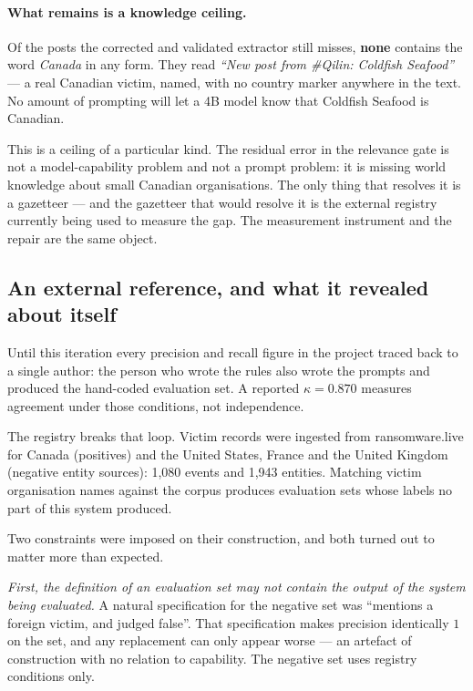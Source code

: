 \documentclass[11pt]{article}
\begin{document}
\paragraph{What remains is a knowledge ceiling.}
Of the posts the corrected and validated extractor still misses, \textbf{none}
contains the word \emph{Canada} in any form. They read \emph{``New post from
\#Qilin: Coldfish Seafood''} --- a real Canadian victim, named, with no country
marker anywhere in the text. No amount of prompting will let a 4B model know
that Coldfish Seafood is Canadian.

\begin{keybox}
This is a ceiling of a particular kind. The residual error in the relevance
gate is not a model-capability problem and not a prompt problem: it is missing
world knowledge about small Canadian organisations. The only thing that
resolves it is a gazetteer --- and the gazetteer that would resolve it is the
external registry currently being used to measure the gap. The measurement
instrument and the repair are the same object.
\end{keybox}

\subsection{An external reference, and what it revealed about itself}

Until this iteration every precision and recall figure in the project traced
back to a single author: the person who wrote the rules also wrote the
prompts and produced the hand-coded evaluation set. A reported $\kappa = 0.870$
measures agreement under those conditions, not independence.

The registry breaks that loop. Victim records were ingested from
ransomware.live for Canada (positives) and the United States, France and the
United Kingdom (negative entity sources): 1{,}080 events and 1{,}943 entities.
Matching victim organisation names against the corpus produces evaluation sets
whose labels no part of this system produced.

Two constraints were imposed on their construction, and both turned out to
matter more than expected.

\emph{First, the definition of an evaluation set may not contain the output of
the system being evaluated.} A natural specification for the negative set was
``mentions a foreign victim, and  judged 
false''. That specification makes  precision identically $1$
on the set, and any replacement can only appear worse --- an artefact of
construction with no relation to capability. The negative set uses registry
conditions only.
\end{document}

